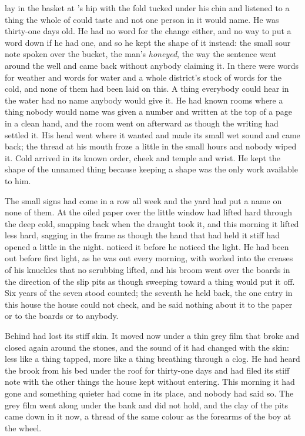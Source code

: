  lay in the basket at 's hip with the fold tucked under his chin and listened to a thing the whole of  could taste and not one person in it would name. He was thirty-one days old. He had no word for the change either, and no way to put a word down if he had one, and so he kept the shape of it instead: the small sour note spoken over the bucket, the man's \emph{honeyed}, the way the sentence went around the well and came back without anybody claiming it. In  there were words for weather and words for water and a whole district's stock of words for the cold, and none of them had been laid on this. A thing everybody could hear in the water had no name anybody would give it. He had known rooms where a thing nobody would name was given a number and written at the top of a page in a clean hand, and the room went on afterward as though the writing had settled it. His head went where it wanted and made its small wet sound and came back; the thread at his mouth froze a little in the small hours and nobody wiped it. Cold arrived in its known order, cheek and temple and wrist. He kept the shape of the unnamed thing because keeping a shape was the only work available to him.

\scenebreak

The small signs had come in a row all week and the yard had put a name on none of them. At  the oiled paper over the little window had lifted hard through the deep cold, snapping back when the draught took it, and this morning it lifted less hard, sagging in the frame as though the hand that had held it stiff had opened a little in the night.  noticed it before he noticed the light. He had been out before first light, as he was out every morning, with  worked into the creases of his knuckles that no scrubbing lifted, and his broom went over the boards in the direction of the slip pits as though sweeping toward a thing would put it off. Six years of the seven stood counted; the seventh he held back, the one entry in this house the house could not check, and he said nothing about it to the paper or to the boards or to anybody.

Behind   had lost its stiff skin. It moved now under a thin grey film that broke and closed again around the stones, and the sound of it had changed with the skin: less like a thing tapped, more like a thing breathing through a clog. He had heard the brook from his bed under the roof for thirty-one days and had filed its stiff note with the other things the house kept without entering. This morning it had gone and something quieter had come in its place, and nobody had said so. The grey film went along under the bank and did not hold, and the clay of the pits came down in it now, a thread of the same colour as the forearms of the boy at the wheel.

